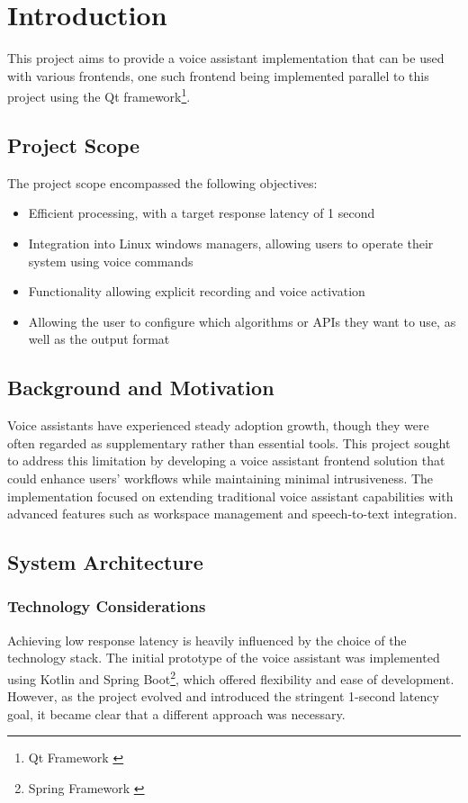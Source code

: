\renewcommand*\chapterpagestyle{scrheadings}
\chapter{Introduction}

This project aims to provide a voice assistant implementation that can be used with various frontends,
one such frontend being implemented parallel to this project using the Qt framework\footnote{Qt Framework \cite{qt}}.

\section{Project Scope}
The project scope encompassed the following objectives:
\begin{itemize}
    \item Efficient processing, with a target response latency of 1 second
    \item Integration into Linux windows managers, allowing users to operate their system using voice commands
    \item Functionality allowing explicit recording and voice activation
    \item Allowing the user to configure which algorithms or APIs they want to use, as well as the output format
\end{itemize}

\section{Background and Motivation}
Voice assistants have experienced steady adoption growth,
though they were often regarded as supplementary rather than essential tools.
This project sought to address this limitation
by developing a voice assistant frontend solution that could enhance users' workflows
while maintaining minimal intrusiveness.
The implementation focused on extending traditional voice assistant capabilities
with advanced features such as workspace management and speech-to-text integration.

\section{System Architecture}
\subsection{Technology Considerations}
Achieving low response latency is heavily influenced by the choice of the technology stack.
The initial prototype of the voice assistant was implemented using Kotlin and Spring Boot\footnote{Spring Framework \cite{spring}}, which offered flexibility and ease of development.
However, as the project evolved and introduced the stringent 1-second latency goal,
it became clear that a different approach was necessary.

